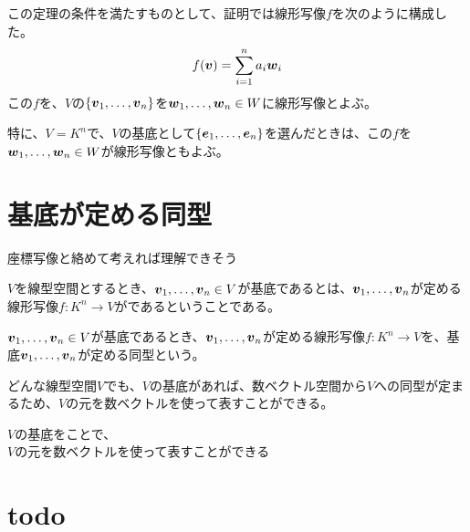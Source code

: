\documentclass[../../../topic_linear-algebra]{subfiles}
\begin{document}
この定理の条件を満たすものとして、証明では線形写像$f$を次のように構成した。
\begin{equation*}
  f(\vb*{v}) = \sum_{i=1}^{n} a_i \vb*{w}_i
\end{equation*}
この$f$を、$V$の$\{ \vb*{v}_1, \ldots, \vb*{v}_n \}$を$\vb*{w}_1, \ldots, \vb*{w}_n \in W$に線形写像とよぶ。

\br

特に、$V = K^n$で、$V$の基底として$\{ \vb*{e}_1, \ldots, \vb*{e}_n \}$を選んだときは、この$f$を$\vb*{w}_1, \ldots, \vb*{w}_n \in W$が線形写像ともよぶ。

\sectionline
\section{基底が定める同型}

\begin{mindflow}
  座標写像と絡めて考えれば理解できそう
\end{mindflow}

$V$を線型空間とするとき、$\vb*{v}_1, \ldots, \vb*{v}_n \in V$が基底であるとは、$\vb*{v}_1, \ldots, \vb*{v}_n$が定める線形写像$f\colon K^n \to V$がであるということである。

\br

$\vb*{v}_1, \ldots, \vb*{v}_n \in V$が基底であるとき、$\vb*{v}_1, \ldots, \vb*{v}_n$が定める線形写像$f\colon K^n \to V$を、基底$\vb*{v}_1, \ldots, \vb*{v}_n$が定める同型という。

\br

どんな線型空間$V$でも、$V$の基底があれば、数ベクトル空間から$V$への同型が定まるため、$V$の元を数ベクトルを使って表すことができる。

\begin{emphabox}
  \begin{spacebox}
    \begin{center}
      $V$の基底をことで、\\
      $V$の元を数ベクトルを使って表すことができる
    \end{center}
  \end{spacebox}
\end{emphabox}

\sectionline
\section{todo}
\end{document}
